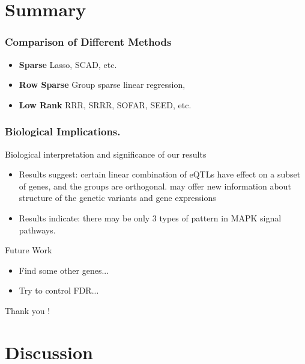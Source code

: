 \section{Summary}
\begin{frame}
\sectionpage
\end{frame}

\begin{frame}
    \frametitle{Comparison of Different Methods}
    \begin{itemize}
        \item \textbf{Sparse} Lasso, SCAD, etc.
        \item \textbf{Row Sparse} Group sparse linear regression,  
        \item \textbf{Low Rank} RRR, SRRR, SOFAR, SEED, etc.
    \end{itemize}
\end{frame}

\begin{frame}
    \frametitle{Biological Implications.}
    \begin{block}{Biological interpretation and significance of our results}
        \begin{itemize}
            \item Results suggest:
            certain linear combination of eQTLs have effect on a subset of genes, and the groups are orthogonal. 
            may offer new information about structure of the genetic variants and gene expressions
            \item Results indicate:
            there may be only $3$ types of pattern in MAPK signal pathways. 
        \end{itemize}
    \end{block}
\end{frame}

\begin{frame}
    \begin{block}{Future Work}
        \begin{itemize}
            \item Find some other genes...
            \item Try to control FDR...
            
        \end{itemize}
    \end{block}


    \vspace{24pt}
    \begin{flushright}
        Thank you !
    \end{flushright}
\end{frame}


\section*{Discussion}
\begin{frame}    
    \sectionpage
\end{frame}